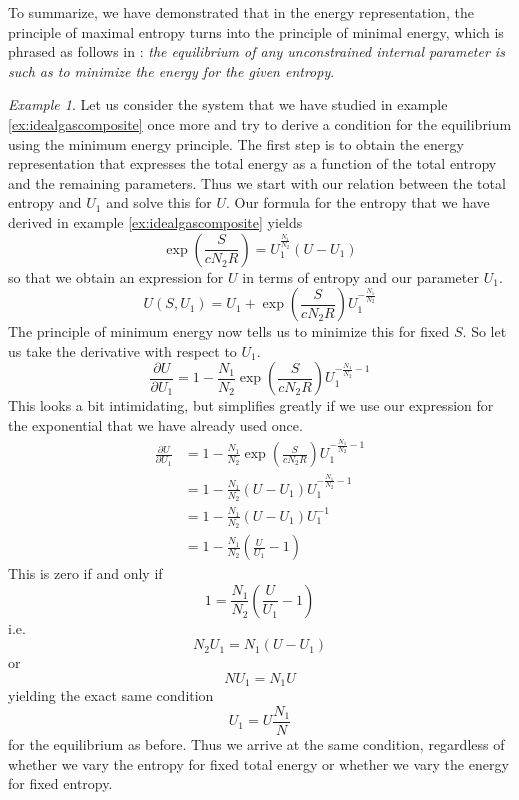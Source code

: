 \documentclass[a4paper, draft]{article}
\theoremstyle{own}
\theoremstyle{remark}
\newtheorem{example}{Example}[section]
\begin{document}
To summarize, we have demonstrated that in the energy representation, the principle of maximal entropy turns into the principle of minimal energy, which is phrased as follows in \cite{Callen}: {\em the equilibrium of any unconstrained internal parameter is such as to minimize the energy for the given entropy}. 

\begin{example}\label{ex:idealgascompositeII}
Let us consider the system that we have studied in example \ref{ex:idealgascomposite} once more and try to derive a condition for the equilibrium using the minimum energy principle. The first step is to obtain the energy representation that expresses the total energy as a function of the total entropy and the remaining parameters.
Thus we start with our relation between the total entropy and $U_1$ and solve this for $U$. Our formula for the entropy  that we have derived in example \ref{ex:idealgascomposite}  yields
$$
\exp(\frac{S}{cN_2R}) = U_1^\frac{N_1}{N_2} (U - U_1)
$$
so that we obtain an expression for $U$ in terms of entropy and our parameter $U_1$. 
$$
U(S, U_1) = U_1 + \exp(\frac{S}{cN_2R}) U_1^{-\frac{N_1}{N_2}}
$$
The principle of minimum energy now tells us to minimize this for fixed $S$. So let us take the derivative with respect to $U_1$.
$$
\frac{\partial U}{\partial U_1} = 1 - \frac{N_1}{N_2} \exp(\frac{S}{cN_2R}) U_1^{-\frac{N_1}{N_2} - 1}
$$
This looks a bit intimidating, but simplifies greatly if we use our expression for the exponential that we have already used once. 
\begin{align*}
	\frac{\partial U}{\partial U_1} &= 1 - \frac{N_1}{N_2} \exp(\frac{S}{cN_2R}) U_1^{-\frac{N_1}{N_2} - 1} \\
	&= 1 - \frac{N_1}{N_2} (U - U_1) U_1^{-\frac{N_1}{N_2} - 1} \\
	&= 1 - \frac{N_1}{N_2} (U - U_1) U_1^{-1} \\
	&= 1 - \frac{N_1}{N_2} ( \frac{U}{U_1} - 1)
\end{align*}
This is zero if and only if
$$
1 = \frac{N_1}{N_2} ( \frac{U}{U_1} - 1)
$$
i.e. 
$$
N_2 U_1 = N_1 (U - U_1)
$$
or
$$
N U_1 = N_1 U
$$
yielding the exact same condition
$$
U_1 = U \frac{N_1}{N}
$$
for the equilibrium as before. Thus we arrive at the same condition, regardless of whether we vary the entropy for fixed total energy or whether we vary the energy for fixed entropy.
\end{example}
\end{document}
